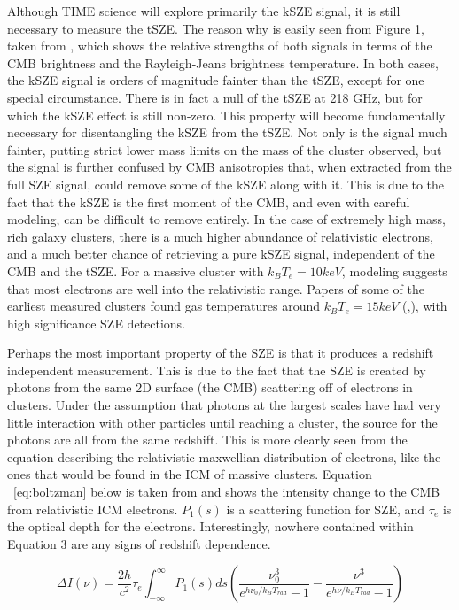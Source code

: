 \documentclass[manuscript]{aastex}
\begin{document}
Although TIME science will explore primarily the kSZE signal, it is still necessary to measure the tSZE. The reason why is easily seen from Figure 1, taken from \cite{Carlstrom2002}, which shows the relative strengths of both signals in terms of the CMB brightness and the Rayleigh-Jeans brightness temperature. In both cases, the kSZE signal is orders of magnitude fainter than the tSZE, except for one special circumstance. There is in fact a null of the tSZE at 218 GHz, but for which the kSZE effect is still non-zero. This property will become fundamentally necessary for disentangling the kSZE from the tSZE. Not only is the signal much fainter, putting strict lower mass limits on the mass of the cluster observed, but the signal is further confused by CMB anisotropies that, when extracted from the full SZE signal, could remove some of the kSZE along with it. This is due to the fact that the kSZE is the first moment of the CMB, and even with careful modeling, can be difficult to remove entirely. In the case of extremely high mass, rich galaxy clusters, there is a much higher abundance of relativistic electrons, and a much better chance of retrieving a pure kSZE signal, independent of the CMB and the tSZE. For a massive cluster with \(k_{B}T_{e} = 10 keV\), modeling suggests that most electrons are well into the relativistic range. Papers of some of the earliest measured clusters found gas temperatures around \(k_{B}T_{e} = 15 keV\) (\cite{Mushotzky1997},\cite{Allen1998}), with high significance SZE detections.

Perhaps the most important property of the SZE is that it produces a redshift independent measurement. This is due to the fact that the SZE is created by photons from the same 2D surface (the CMB) scattering off of electrons in clusters. Under the assumption that photons at the largest scales have had very little interaction with other particles until reaching a cluster, the source for the photons are all from the same redshift. This is more clearly seen from the equation describing the relativistic maxwellian distribution of electrons, like the ones that would be found in the ICM of massive clusters. Equation ~\ref{eq:boltzman} below is taken from \cite{Birkinshaw1999} and shows the intensity change to the CMB from relativistic ICM electrons. \(P_{1}(s)\) is a scattering function for SZE,  and \(\tau_{e}\) is the optical depth for the electrons. Interestingly, nowhere contained within Equation 3 are any signs of redshift dependence.

\begin{equation}\label{eq:boltzman}
\Delta I(\nu) = \frac{2h}{c^{2}}\tau_{e} \int_{-\infty}^{\infty} P_{1}(s) ds (\frac{\nu_{0}^{3}}{e^{h\nu_{0}/k_{B}T_{rad}}-1}  - \frac{\nu^{3}}{e^{h\nu/k_{B}T_{rad}}-1})
\end{equation}
\end{document}
